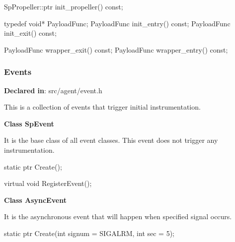 \begin{apient}
SpPropeller::ptr init_propeller() const;
\end{apient}

\begin{apient}
typedef void* PayloadFunc;
PayloadFunc init_entry() const;
PayloadFunc init_exit() const;
\end{apient}

\begin{apient}
PayloadFunc wrapper_exit() const;
PayloadFunc wrapper_entry() const;
\end{apient}

\subsubsection{Events}
\textbf{Declared in}: src/agent/event.h

This is a collection of events that trigger initial instrumentation.

\textbf{Class SpEvent}

It is the base class of all event classes. This event does not trigger any
instrumentation.

\begin{apient}
static ptr Create();
\end{apient}

\begin{apient}
virtual void RegisterEvent();
\end{apient}

\textbf{Class AsyncEvent}

It is the asynchronous event that will happen when specified signal occurs.

\begin{apient}
static ptr Create(int signum = SIGALRM,
                  int sec = 5);
\end{apient}

